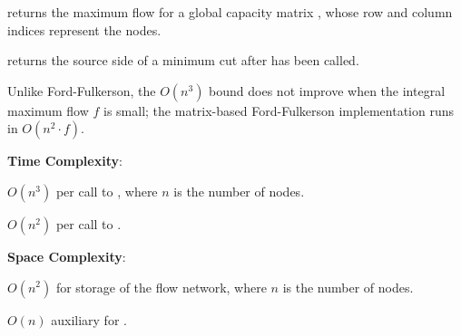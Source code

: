 \begin{compactitem}
  \item {} returns the maximum flow for a global capacity matrix , whose row and column indices represent the nodes.
  \item {} returns the source side of a minimum cut after  has been called.
\end{compactitem}

Unlike Ford-Fulkerson, the $O(n^{3})$ bound does not improve when the integral maximum flow $f$ is small; the matrix-based Ford-Fulkerson implementation runs in $O(n^{2} \cdot f)$.

\textbf{Time Complexity}:
\begin{compactitem}
  \item $O(n^{3})$ per call to , where $n$ is the number of nodes.
  \item $O(n^{2})$ per call to .
\end{compactitem}

\textbf{Space Complexity}:
\begin{compactitem}
  \item $O(n^{2})$ for storage of the flow network, where $n$ is the number of nodes.
  \item $O(n)$ auxiliary for .
\end{compactitem}

